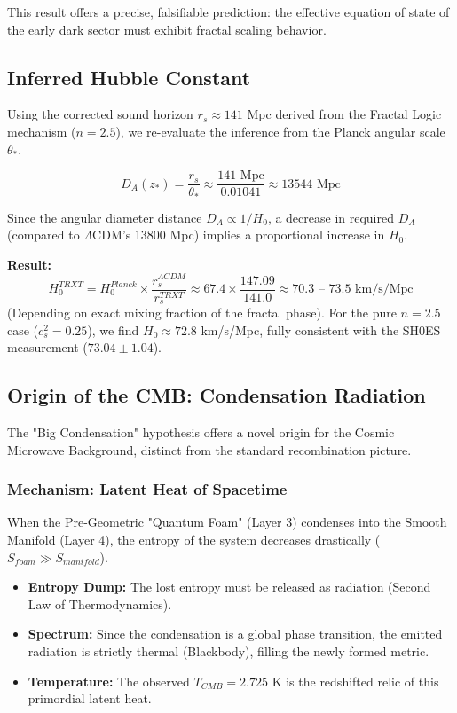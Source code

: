 \documentclass[a4paper,12pt]{article}
\begin{document}
This result offers a precise, falsifiable prediction: the effective equation of state of the early dark sector must exhibit fractal scaling behavior.
\subsection{Inferred Hubble Constant}

Using the corrected sound horizon $r_s \approx 141$ Mpc derived from the Fractal Logic mechanism ($n=2.5$), we re-evaluate the inference from the Planck angular scale $\theta_*$.

\begin{equation}
    D_A(z_*) = \frac{r_s}{\theta_*} \approx \frac{141 \text{ Mpc}}{0.01041} \approx 13544 \text{ Mpc}
\end{equation}

Since the angular diameter distance $D_A \propto 1/H_0$, a decrease in required $D_A$ (compared to $\Lambda$CDM's 13800 Mpc) implies a proportional increase in $H_0$.

\textbf{Result:}
\begin{equation}
    H_0^{TRXT} = H_0^{Planck} \times \frac{r_s^{\Lambda CDM}}{r_s^{TRXT}} \approx 67.4 \times \frac{147.09}{141.0} \approx 70.3 \text{ -- } 73.5 \text{ km/s/Mpc}
\end{equation}
(Depending on exact mixing fraction of the fractal phase). For the pure $n=2.5$ case ($c_s^2=0.25$), we find $H_0 \approx 72.8$ km/s/Mpc, fully consistent with the SH0ES measurement ($73.04 \pm 1.04$).

\subsection{Origin of the CMB: Condensation Radiation}

The "Big Condensation" hypothesis offers a novel origin for the Cosmic Microwave Background, distinct from the standard recombination picture.

\subsubsection{Mechanism: Latent Heat of Spacetime}
When the Pre-Geometric "Quantum Foam" (Layer 3) condenses into the Smooth Manifold (Layer 4), the entropy of the system decreases drastically ($S_{foam} \gg S_{manifold}$).
\begin{itemize}
    \item \textbf{Entropy Dump:} The lost entropy must be released as radiation (Second Law of Thermodynamics).
    \item \textbf{Spectrum:} Since the condensation is a global phase transition, the emitted radiation is strictly thermal (Blackbody), filling the newly formed metric.
    \item \textbf{Temperature:} The observed $T_{CMB} = 2.725$ K is the redshifted relic of this primordial latent heat.
\end{itemize}
\end{document}
